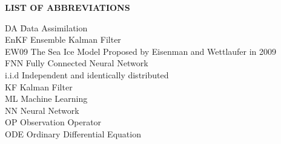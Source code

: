 {}

\begin{center}
{\Large \textbf{LIST OF ABBREVIATIONS}}
\end{center}

\newcommand{\Ab}[2]{\noindent  #1 \> #2 \\}
\newcommand{\Abi}[2]{\noindent #1 \hspace{1.5cm} \= #2 \\}

\begin{tabbing}
\Abi{DA}{Data Assimilation}
\Ab{EnKF}{Ensemble Kalman Filter}
\Ab{EW09}{The Sea Ice Model Proposed by Eisenman and Wettlaufer in 2009}
\Ab{FNN}{Fully Connected Neural Network}
\Ab{i.i.d}{Independent and identically distributed}
\Ab{KF}{Kalman Filter}
\Ab{ML}{Machine Learning}
\Ab{NN}{Neural Network}
\Ab{OP}{Observation Operator}
\Ab{ODE}{Ordinary Differential Equation}

\end{tabbing}

\clearpage
